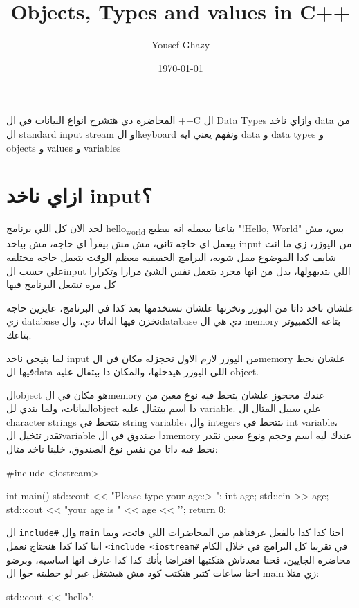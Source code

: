 \documentclass[11pt]{article}
\author{Yousef Ghazy}
\date{\today}
\title{Objects, Types and values in C++}
\let\OriginalVerbatim\verbatim
\let\endOriginalVerbatim\endverbatim
\renewenvironment{verbatim}{\begin{english}\OriginalVerbatim}{\endOriginalVerbatim\end{english}}
\begin{document}
\maketitle
\setcounter{tocdepth}{2}
\tableofcontents

المحاضره دي هتشرح انواع البيانات في ال ++C ال Data Types وازاي ناخد data من ال standard input stream او الkeyboard ونفهم يعني ايه data و data types و objects و values و variables
\section{ازاي ناخد input؟}
\label{sec:orgf4c9c67}
لحد الان كل اللي برنامج hello\textsubscript{world} بتاعنا بيعمله انه بيطبع "!Hello, World" بس، مش بيعمل اي حاجه تاني، مش مش بيقرأ اي حاجه، مش بياخد input من اليوزر، زي ما انت شايف كدا الموضوع ممل شويه، البرامج الحقيقيه معظم الوقت بتعمل حاجه مختلفه علي حسب الinput اللي بتديهولها، بدل من انها مجرد بتعمل نفس الشئ مرارا وتكرارا كل مره تشغل البرنامج فيها

علشان ناخد داتا من اليوزر ونخزنها علشان نستخدمها بعد كدا في البرنامج، عايزين حاجه زي database نخزن فيها الداتا دي، والdatabase دي هي ال memory بتاعه الكمبيوتر بتاعك.

لما بنيجي ناخد input من اليوزر لازم الاول نحجزله مكان في الmemory علشان نحط فيها الdata اللي اليوزر هيدخلها، والمكان دا بيتقال عليه object.

الobject هو مكان في الmemory عندك محجوز علشان يتحط فيه نوع معين من البيانات، ولما بندي للobject دا اسم بيتقال عليه variable. علي سبيل المثال ال character strings بتتحط في string variable، وال integers بتتحط في int variable، تقدر تتخيل الvariable دا صندوق في الmemory عندك ليه اسم وحجم ونوع معين نقدر نحط فيه داتا من نفس نوع الصندوق، خلينا ناخد مثال:

\begin{verbatim}
#include <iostream>

int main() {
    std::cout << "Please type your age:\n> ";
    int age;
    std::cin >> age;
    std::cout << "your age is " << age << '\n';
    return 0;
}
\end{verbatim}

ال \texttt{include\#} وال \texttt{main} احنا كدا كدا بالفعل عرفناهم من المحاضرات اللي فاتت، وبما اننا كدا كدا هنحتاج نعمل \texttt{<include <iostream\#} في تقريبا كل البرامج في خلال الكام محاضره الجايين، فحنا معدناش هنكتبها افتراضا بأنك كدا كدا عارف انها اساسيه، وبرضو احنا ساعات كتير هنكتب كود مش هيشتغل غير لو حطيته جوا ال main زي مثلا:

\begin{verbatim}
std::cout << "hello\n";
\end{verbatim}
\end{document}
